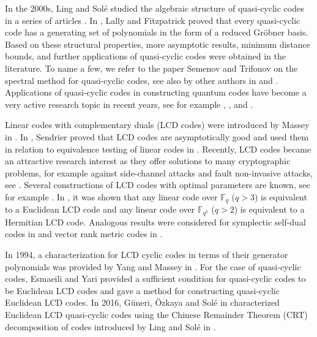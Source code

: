 \documentclass[a4paper,12pt]{article}
\begin{document}
 In the  2000s, Ling and Sol\'e studied  the algebraic structure of quasi-cyclic codes in a series of articles \cite{ling2001,ling2003,ling2005,ling2006}.    In \cite{lally2001}, Lally and Fitzpatrick proved  that every quasi-cyclic code has a generating set of polynomials in the form of a reduced Gr\"obner basis. Based on these structural properties,  more  asymptotic results, minimum distance bounds, and further applications of quasi-cyclic codes were obtained in the literature.  To name a few, we refer to the paper Semenov and Trifonov \cite{semenov2012} on the spectral method for  quasi-cyclic codes, see also by other authors in \cite{luo2024} and \cite{zeh2016}.  
Applications of quasi-cyclic codes in constructing quantum codes have become a very active research topic in recent years, see for example  \cite{ezerman2025}, \cite{galindo2018}, and \cite{guan2024}.  

 Linear codes with complementary duals (LCD codes) were introduced by Massey in \cite{massey}.
In \cite{sendrier1997},  Sendrier proved that LCD codes are asymptotically good and used
them in relation to equivalence testing of linear codes in \cite{sendrier2000}.
 Recently, LCD codes became an attractive research interest as they offer solutions
 to many cryptographic problems, for example against side-channel attacks and fault non-invasive attacks, see \cite{carlet2016}. 
 Several constructions of LCD codes with optimal parameters are known, see for example \cite{abdukhalikov2025, bouyuklieva2021, carlet2018mds, liu2021, sok2018, wu2021}.
 In \cite{carlet2018}, it was shown that  any linear code over $\mathbb{F}_q$ ($q  > 3$) is equivalent to a Euclidean LCD code and any linear code over $\mathbb{F}_{q^2}$ ($q  > 2$) is equivalent to a Hermitian LCD code. 
Analogous results were considered for symplectic self-dual  codes in \cite{li2024b} and vector rank metric codes in \cite{ho2025}.  
 
 
  In 1994, a characterization  for LCD cyclic codes  in terms of their generator polynomials was provided by Yang and Massey in \cite{yang1994}.  
 For the case of quasi-cyclic codes,  Esmaeili and Yari \cite{esmaeili2009} provided   a sufficient condition
 for quasi-cyclic codes to be Euclidean LCD codes and gave a method for constructing quasi-cyclic Euclidean LCD codes.
 In 2016, G\"uneri, \"Ozkaya  and Sol\'e in  \cite{guneri2016}  characterized Euclidean LCD quasi-cyclic codes using the Chinese Remainder Theorem (CRT) decomposition of codes introduced by Ling and Sol\'e in \cite{ling2001}. 
\end{document}

